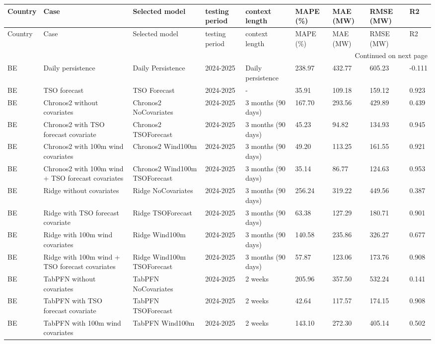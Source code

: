 \begin{longtable}{lllllllll}
\toprule
Country & Case & Selected model & testing period & context length & MAPE (\%) & MAE (MW) & RMSE (MW) & R2 \\
\midrule
\endfirsthead
\toprule
Country & Case & Selected model & testing period & context length & MAPE (\%) & MAE (MW) & RMSE (MW) & R2 \\
\midrule
\endhead
\midrule
\multicolumn{9}{r}{Continued on next page} \\
\midrule
\endfoot
\bottomrule
\endlastfoot
BE & Daily persistence & Daily Persistence & 2024-2025 & Daily persistence & 238.97 & 432.77 & 605.23 & -0.111 \\
BE & TSO forecast & TSO Forecast & 2024-2025 & - & 35.91 & 109.18 & 159.12 & 0.923 \\
BE & Chronos2 without covariates & Chronos2 NoCovariates & 2024-2025 & 3 months (90 days) & 167.70 & 293.56 & 429.89 & 0.439 \\
BE & Chronos2 with TSO forecast covariate & Chronos2 TSOForecast & 2024-2025 & 3 months (90 days) & 45.23 & 94.82 & 134.93 & 0.945 \\
BE & Chronos2 with 100m wind covariates & Chronos2 Wind100m & 2024-2025 & 3 months (90 days) & 49.20 & 113.25 & 161.55 & 0.921 \\
BE & Chronos2 with 100m wind + TSO forecast covariates & Chronos2 Wind100m TSOForecast & 2024-2025 & 3 months (90 days) & 35.14 & 86.77 & 124.63 & 0.953 \\
BE & Ridge without covariates & Ridge NoCovariates & 2024-2025 & 3 months (90 days) & 256.24 & 319.22 & 449.56 & 0.387 \\
BE & Ridge with TSO forecast covariate & Ridge TSOForecast & 2024-2025 & 3 months (90 days) & 63.38 & 127.29 & 180.71 & 0.901 \\
BE & Ridge with 100m wind covariates & Ridge Wind100m & 2024-2025 & 3 months (90 days) & 140.58 & 235.86 & 326.27 & 0.677 \\
BE & Ridge with 100m wind + TSO forecast covariates & Ridge Wind100m TSOForecast & 2024-2025 & 3 months (90 days) & 57.87 & 123.06 & 173.76 & 0.908 \\
BE & TabPFN without covariates & TabPFN NoCovariates & 2024-2025 & 2 weeks & 205.96 & 357.50 & 532.24 & 0.141 \\
BE & TabPFN with TSO forecast covariate & TabPFN TSOForecast & 2024-2025 & 2 weeks & 42.64 & 117.57 & 174.15 & 0.908 \\
BE & TabPFN with 100m wind covariates & TabPFN Wind100m & 2024-2025 & 2 weeks & 143.10 & 272.30 & 405.14 & 0.502 \\

\end{longtable}
